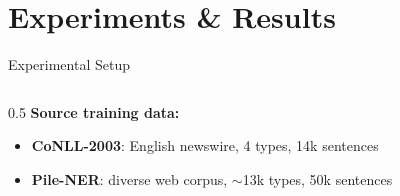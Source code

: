 \documentclass[aspectratio=169,10pt]{beamer}
\begin{document}
\section{Experiments \& Results}

\begin{frame}{Experimental Setup}
  \begin{columns}[T]
    \begin{column}{0.5\textwidth}
      \textbf{Source training data:}
      \vspace{0.2em}
      \begin{itemize}
        \item \textbf{CoNLL-2003}: English newswire, 4 types, 14k sentences
        \item \textbf{Pile-NER}: diverse web corpus, $\sim$13k types, 50k sentences
      \end{itemize}


\end{column}
\end{columns}
\end{frame}
\end{document}
